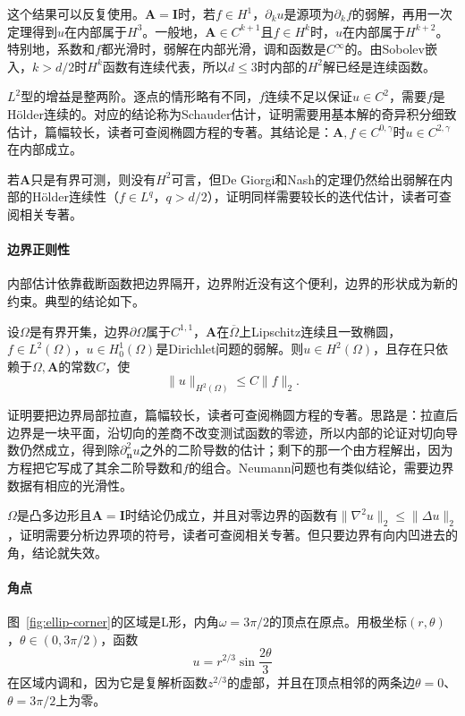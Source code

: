 这个结果可以反复使用。$\bm{A}=\bm{I}$时，若$f\in H^1$，$\partial_ku$是源项为$\partial_kf$的弱解，再用一次定理得到$u$在内部属于$H^3$。一般地，$\bm{A}\in C^{k+1}$且$f\in H^k$时，$u$在内部属于$H^{k+2}$。特别地，系数和$f$都光滑时，弱解在内部光滑，调和函数是$C^\infty$的。由Sobolev嵌入，$k>d/2$时$H^k$函数有连续代表，所以$d\leq3$时内部的$H^2$解已经是连续函数。

$L^2$型的增益是整两阶。逐点的情形略有不同，$f$连续不足以保证$u\in C^2$，需要$f$是Hölder连续的。对应的结论称为Schauder估计，证明需要用基本解的奇异积分细致估计，篇幅较长，读者可查阅椭圆方程的专著。其结论是：$\bm{A},f\in C^{0,\gamma}$时$u\in C^{2,\gamma}$在内部成立。

若$\bm{A}$只是有界可测，则没有$H^2$可言，但De Giorgi和Nash的定理仍然给出弱解在内部的Hölder连续性（$f\in L^q$，$q>d/2$），证明同样需要较长的迭代估计，读者可查阅相关专著。

\paragraph{边界正则性}
内部估计依靠截断函数把边界隔开，边界附近没有这个便利，边界的形状成为新的约束。典型的结论如下。

\begin{theorem}[整体$H^2$正则性]
\label{thm:ellip-boundary}
设$\Omega$是有界开集，边界$\partial\Omega$属于$C^{1,1}$，$\bm{A}$在$\overline\Omega$上Lipschitz连续且一致椭圆，$f\in L^2(\Omega)$，$u\in H^1_0(\Omega)$是Dirichlet问题的弱解。则$u\in H^2(\Omega)$，且存在只依赖于$\Omega,\bm{A}$的常数$C$，使
\begin{equation}
 \lVert u\rVert_{H^2(\Omega)}\leq C\lVert f\rVert_2 .
 \label{eq:ellip-boundary-regularity}
\end{equation}
\end{theorem}

证明要把边界局部拉直，篇幅较长，读者可查阅椭圆方程的专著。思路是：拉直后边界是一块平面，沿切向的差商不改变测试函数的零迹，所以内部的论证对切向导数仍然成立，得到除$\partial_{\bm{n}}^2u$之外的二阶导数的估计；剩下的那一个由方程解出，因为方程把它写成了其余二阶导数和$f$的组合。Neumann问题也有类似结论，需要边界数据有相应的光滑性。

$\Omega$是凸多边形且$\bm{A}=\bm{I}$时结论仍成立，并且对零边界的函数有$\lVert\nabla^2u\rVert_2\leq\lVert\Delta u\rVert_2$，证明需要分析边界项的符号，读者可查阅相关专著。但只要边界有向内凹进去的角，结论就失效。

\paragraph{角点}
图~\ref{fig:ellip-corner}的区域是L形，内角$\omega=3\pi/2$的顶点在原点。用极坐标$(r,\theta)$，$\theta\in(0,3\pi/2)$，函数
\begin{equation}
 u=r^{2/3}\sin\frac{2\theta}{3}
 \label{eq:ellip-corner}
\end{equation}
在区域内调和，因为它是复解析函数$z^{2/3}$的虚部，并且在顶点相邻的两条边$\theta=0$、$\theta=3\pi/2$上为零。

